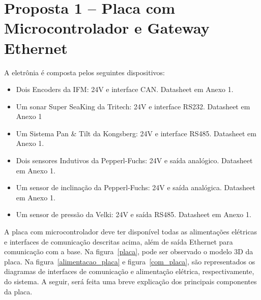 


\section{Proposta 1 – Placa com Microcontrolador e Gateway Ethernet}

A eletrônia é composta pelos seguintes dispositivos:
\begin{itemize}
  \item Dois Encoders da IFM: 24V e interface CAN. Datasheet em Anexo 1.
  \item Um sonar Super SeaKing da Tritech: 24V e interface RS232. Datasheet em
  Anexo 1
  \item Um Sistema Pan \& Tilt da Kongsberg: 24V e interface RS485. Datasheet em
  Anexo 1.
  \item Dois sensores Indutivos da Pepperl-Fuchs: 24V e saída analógico.
  Datasheet em Anexo 1.
  \item Um sensor de inclinação da Pepperl-Fuchs: 24V e saída analógica.
  Datasheet em Anexo 1.
  \item Um sensor de pressão da Velki: 24V e saída RS485. Datasheet em Anexo 1.
\end{itemize}	

A placa com microcontrolador deve ter disponível todas as alimentações elétricas
e interfaces de comunicação descritas acima, além de saída Ethernet para
comunicação com a base. Na figura~\ref{placa}, pode ser observado o modelo 3D da
placa. Na figura~\ref{alimentacao_placa} e figura~\ref{com_placa}, são
representados os diagramas de interfaces de comunicação e alimentação elétrica, respectivamente, do sistema. A seguir, será feita uma breve explicação dos principais componentes da placa.

